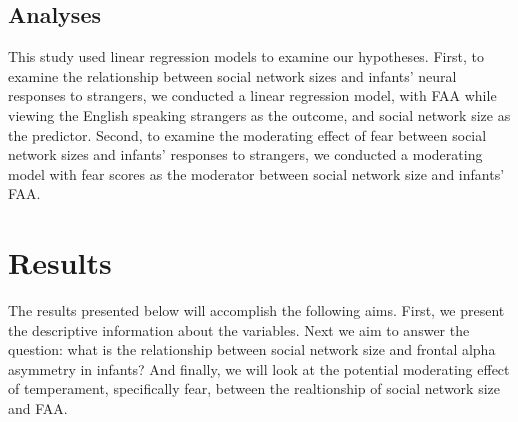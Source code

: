 \documentclass[
  man,
  floatsintext,
  longtable,
  nolmodern,
  notxfonts,
  notimes,
  colorlinks=true,linkcolor=blue,citecolor=blue,urlcolor=blue]{apa7}
\begin{document}
\subsection{Analyses}\label{analyses}

This study used linear regression models to examine our hypotheses.
First, to examine the relationship between social network sizes and
infants' neural responses to strangers, we conducted a linear regression
model, with FAA while viewing the English speaking strangers as the
outcome, and social network size as the predictor. Second, to examine
the moderating effect of fear between social network sizes and infants'
responses to strangers, we conducted a moderating model with fear scores
as the moderator between social network size and infants' FAA.

\section{Results}\label{results}

The results presented below will accomplish the following aims. First,
we present the descriptive information about the variables. Next we aim
to answer the question: what is the relationship between social network
size and frontal alpha asymmetry in infants? And finally, we will look
at the potential moderating effect of temperament, specifically fear,
between the realtionship of social network size and FAA.
\end{document}
